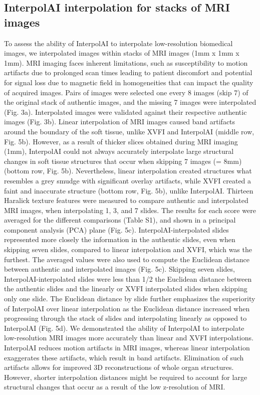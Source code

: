 \begin{refsection}
    \section{InterpolAI interpolation for stacks of MRI images}
    To assess the ability of InterpolAI to interpolate low-resolution biomedical images, we interpolated images within stacks of MRI images (1mm x 1mm x 1mm). MRI imaging faces inherent limitations, such as susceptibility to motion artifacts due to prolonged scan times leading to patient discomfort and potential for signal loss due to magnetic field in homogeneities that can impact the quality of acquired images. Pairs of images were selected one every 8 images (skip 7) of the original stack of authentic images, and the missing 7 images were interpolated (Fig. 3a). Interpolated images were validated against their respective authentic images (Fig. 3b).
    Linear interpolation of MRI images caused band artifacts around the boundary of the soft tissue, unlike XVFI and InterpolAI (middle row, Fig. 5b). However, as a result of thicker slices obtained during MRI imaging (1mm), InterpolAI could not always accurately interpolate large structural changes in soft tissue structures that occur when skipping 7 images (= 8mm) (bottom row, Fig. 5b). Nevertheless, linear interpolation created structures what resembles a grey smudge with significant overlay artifacts, while XVFI created a faint and inaccurate structure (bottom row, Fig. 5b), unlike InterpolAI. 
    Thirteen Haralick texture features were measured to compare authentic and interpolated MRI images, when interpolating 1, 3, and 7 slides. The results for each score were averaged for the different comparisons (Table S1), and shown in a principal component analysis (PCA) plane (Fig. 5c). InterpolAI-interpolated slides represented more closely the information in the authentic slides, even when skipping seven slides, compared to linear interpolation and XVFI, which was the furthest. The averaged values were also used to compute the Euclidean distance between authentic and interpolated images (Fig. 5c). Skipping seven slides, InterpolAI-interpolated slides were less than 1/2 the Euclidean distance between the authentic slides and the linearly or XVFI interpolated slides when skipping only one slide. The Euclidean distance by slide further emphasizes the superiority of InterpolAI over linear interpolation as the Euclidean distance increased when progressing through the stack of slides and interpolating linearly as opposed to InterpolAI (Fig. 5d). 
    We demonstrated the ability of InterpolAI to interpolate low-resolution MRI images more accurately than linear and XVFI interpolations. InterpolAI reduces motion artifacts in MRI images, whereas linear interpolation exaggerates these artifacts, which result in band artifacts. Elimination of such artifacts allows for improved 3D reconstructions of whole organ structures. However, shorter interpolation distances might be required to account for large structural changes that occur as a result of the low z-resolution of MRI.
    

\end{refsection}
